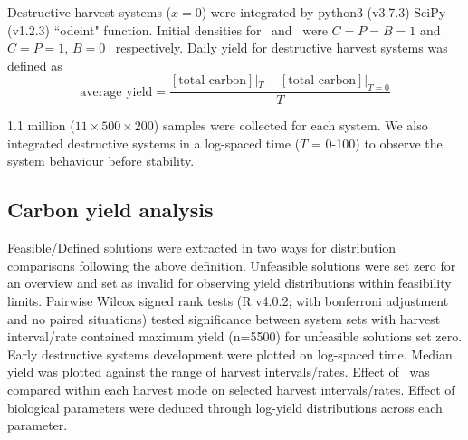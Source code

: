 \documentclass[../thesis.tex]{subfiles} %
\begin{document}
Destructive harvest systems ($x=0$) were integrated by python3 (v3.7.3) SciPy (v1.2.3) ``odeint" function.  Initial densities for \PBN\ and \PoN\ were $C=P=B=1$ and $C=P=1$, $B=0$ \den\ respectively.  Daily yield for destructive harvest systems was defined as
\begin{equation}
    \text{average yield} = \dfrac{[\text{total carbon}]|_{T}-[\text{total carbon}]|_{T=0}}{T}
    \label{eq:avgYd}
\end{equation}

1.1 million ($11\times500\times200$) samples were collected for each system.  We also integrated destructive systems in a log-spaced time ($T$ = 0-100) to observe the system behaviour before stability.

\subsection{Carbon yield analysis}
Feasible/Defined solutions were extracted in two ways for distribution comparisons following the above definition.  Unfeasible solutions were set zero for an overview and set as invalid for observing yield distributions within feasibility limits.  Pairwise Wilcox signed rank tests (R v4.0.2; with bonferroni adjustment and no paired situations) tested significance between system sets with harvest interval/rate contained maximum yield (n=5500) for unfeasible solutions set zero.  Early destructive systems development were plotted on log-spaced time.  Median yield was plotted against the range of harvest intervals/rates.  Effect of \bac\ was compared within each harvest mode on selected harvest intervals/rates.  Effect of biological parameters were deduced through log-yield distributions across each parameter.
\end{document}
